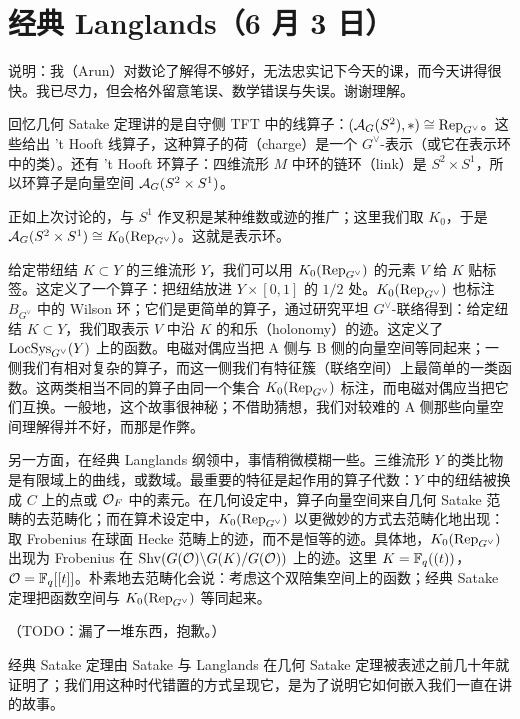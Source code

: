 \section[经典 Langlands]{经典 Langlands（6 月 3 日）}


说明：我（Arun）对数论了解得不够好，无法忠实记下今天的课，而今天讲得很快。我已尽力，但会格外留意笔误、数学错误与失误。谢谢理解。

回忆几何 Satake 定理讲的是自守侧 TFT 中的线算子：$(\mathcal{A}_G(S^2),*)\cong\operatorname{Rep}_{G^\vee}$。这些给出 't Hooft 线算子，这种算子的荷（charge）是一个 $G^\vee$-表示（或它在表示环中的类）。还有 't Hooft 环算子：四维流形 $M$ 中环的链环（link）是 $S^2\times S^1$，所以环算子是向量空间 $\mathcal{A}_G(S^2\times S^1)$。


正如上次讨论的，与 $S^1$ 作叉积是某种维数或迹的推广；这里我们取 $K_0$，于是 $\mathcal{A}_G(S^2\times S^1)\cong K_0(\operatorname{Rep}_{G^\vee})$。这就是表示环。

给定带纽结 $K\subset Y$ 的三维流形 $Y$，我们可以用 $K_0(\operatorname{Rep}_{G^\vee})$ 的元素 $V$ 给 $K$ 贴标签。这定义了一个算子：把纽结放进 $Y\times[0,1]$ 的 $1/2$ 处。$K_0(\operatorname{Rep}_{G^\vee})$ 也标注 $B_{G^\vee}$ 中的 Wilson 环；它们是更简单的算子，通过研究平坦 $G^\vee$-联络得到：给定纽结 $K\subset Y$，我们取表示 $V$ 中沿 $K$ 的和乐（holonomy）的迹。这定义了 $\mathrm{LocSys}_{G^\vee}(Y)$ 上的函数。电磁对偶应当把 A 侧与 B 侧的向量空间等同起来；一侧我们有相对复杂的算子，而这一侧我们有特征簇（联络空间）上最简单的一类函数。这两类相当不同的算子由同一个集合 $K_0(\operatorname{Rep}_{G^\vee})$ 标注，而电磁对偶应当把它们互换。一般地，这个故事很神秘；不借助猜想，我们对较难的 A 侧那些向量空间理解得并不好，而那是作弊。

另一方面，在经典 Langlands 纲领中，事情稍微模糊一些。三维流形 $Y$ 的类比物是有限域上的曲线，或数域。最重要的特征是起作用的算子代数：$Y$ 中的纽结被换成 $C$ 上的点或 $\mathcal{O}_F$ 中的素元。在几何设定中，算子向量空间来自几何 Satake 范畴的去范畴化；而在算术设定中，$K_0(\operatorname{Rep}_{G^\vee})$ 以更微妙的方式去范畴化地出现：取 Frobenius 在球面 Hecke 范畴上的迹，而不是恒等的迹。具体地，$K_0(\operatorname{Rep}_{G^\vee})$ 出现为 Frobenius 在 $\mathrm{Shv}(G(\mathcal{O})\backslash G(K)/G(\mathcal{O}))$ 上的迹。这里 $K=\mathbb{F}_q((t))$，$\mathcal{O}=\mathbb{F}_q[[t]]$。朴素地去范畴化会说：考虑这个双陪集空间上的函数；经典 Satake 定理把函数空间与 $K_0(\operatorname{Rep}_{G^\vee})$ 等同起来。

（TODO：漏了一堆东西，抱歉。）

经典 Satake 定理由 Satake 与 Langlands 在几何 Satake 定理被表述之前几十年就证明了；我们用这种时代错置的方式呈现它，是为了说明它如何嵌入我们一直在讲的故事。

